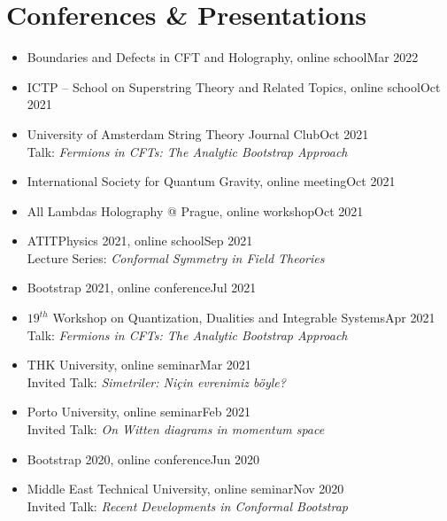 \documentclass[a4paper,11pt]{article}
\begin{document}
\section{\textcolor{burntorange}{Conferences \& Presentations}}
\begin{itemize}[itemsep=.001em] 
	\item[] Boundaries and Defects in CFT and Holography, online school\hfill Mar 2022
	\\
	\item[] ICTP -- School on Superstring Theory and Related Topics, online school\hfill Oct 2021
	\\
	\item[] University of Amsterdam String Theory Journal Club\hfill Oct 2021
	\\
	\hspace*{1.8em}Talk: \emph{Fermions in CFTs: The Analytic Bootstrap Approach}
	\item[] International Society for Quantum Gravity, online meeting\hfill Oct 2021
	\item[] All Lambdas Holography @ Prague, online workshop\hfill Oct 2021
	\item[] ATITPhysics 2021, online school\hfill Sep 2021\\
	\hspace*{1.8em}Lecture Series: \emph{Conformal Symmetry in Field Theories}
	\item[] Bootstrap 2021, online conference\hfill Jul 2021
	\item[] $19^{th}$ Workshop on
	Quantization, Dualities and Integrable Systems\hfill Apr 2021
	\\
	\hspace*{1.8em}Talk: \emph{Fermions in CFTs: The Analytic Bootstrap Approach}
	\item[] THK University, online seminar\hfill Mar 2021
\\
\hspace*{1.8em}Invited Talk: \emph{Simetriler: Niçin evrenimiz böyle?}
	\item[] Porto University, online seminar\hfill Feb 2021
\\
\hspace*{1.8em}Invited Talk: \emph{On Witten diagrams in momentum space}
	\item[] Bootstrap 2020, online conference\hfill Jun 2020
	\item[] Middle East Technical University, online seminar\hfill Nov 2020\\
\hspace*{1.8em} Invited Talk: \emph{Recent Developments in Conformal Bootstrap}

\end{itemize}
\end{document}
